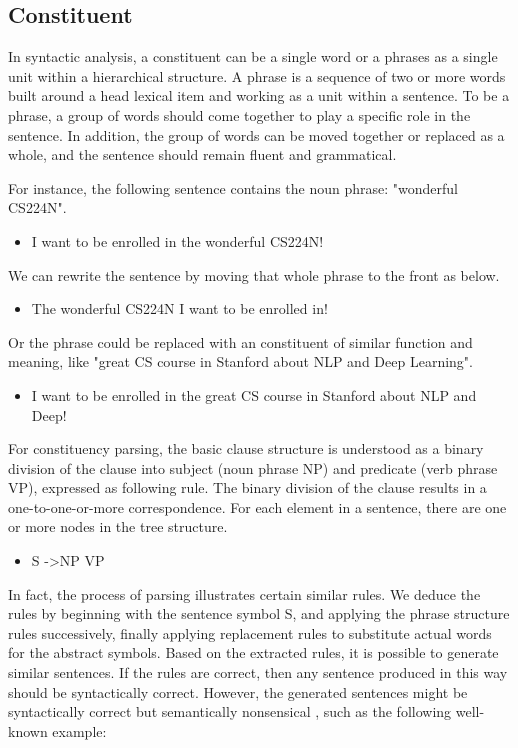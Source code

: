 \documentclass{tufte-handout}
\begin{document}
\subsection{Constituent}
In syntactic analysis, a constituent can be a single word or a phrases as a single unit within a hierarchical structure. A phrase is a sequence of two or more words built around a head lexical item and working as a unit within a sentence. To be a phrase, a group of words should come together to play a specific role in the sentence. In addition, the group of words can be moved together or replaced as a whole, and the sentence should remain fluent and grammatical.

For instance, the following sentence contains the noun phrase: "wonderful CS224N".
\begin{itemize}
\item I want to be enrolled in the wonderful CS224N!
\end{itemize}

We can rewrite the sentence by moving that whole phrase to the front as below. 
\begin{itemize}
\item The wonderful CS224N I want to be enrolled in!
\end{itemize}

Or the phrase could be replaced with an constituent of similar function and meaning, like "great CS course in Stanford about NLP and Deep Learning".

\begin{itemize}
\item I want to be enrolled in the great CS course in Stanford about NLP and Deep!
\end{itemize}

For constituency parsing, the basic clause structure is understood as a binary division of the clause into subject (noun phrase NP) and predicate (verb phrase VP), expressed as following rule. The binary division of the clause results in a one-to-one-or-more correspondence. For each element in a sentence, there are one or more nodes in the tree structure.

\begin{itemize}
\item S ->\quad NP \quad VP
\end{itemize}

In fact, the process of parsing illustrates certain similar rules. We deduce the rules by beginning with the sentence symbol S, and applying the phrase structure rules successively, finally applying replacement rules to substitute actual words for the abstract symbols. Based on the extracted rules, it is possible to generate similar sentences. If the rules are correct, then any sentence produced in this way should be syntactically correct. However, the generated sentences might be syntactically correct but semantically nonsensical , such as the following well-known example:
\end{document}
